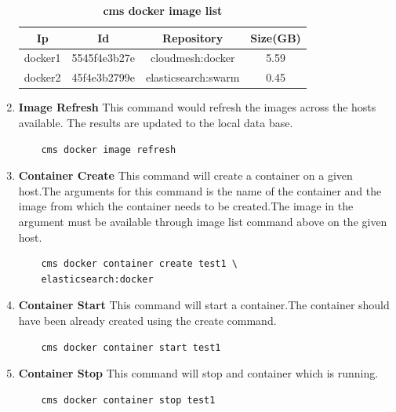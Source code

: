 \documentclass[9pt,twocolumn,twoside]{../../styles/osajnl}
\begin{document}
\begin{enumerate}
    \begin{table}[h!]
     \caption{\bf cms docker image list }
     \begin{tabular}{cccc}
     \hline
      Ip & Id & Repository & Size(GB)\\
      \hline
      docker1 & 5545f4e3b27e & cloudmesh:docker & 5.59 \\
      docker2 & 45f4e3b2799e & elasticsearch:swarm & 0.45 \\
     \hline
     \end{tabular}
     \label{tab:tab2}
     \end{table}
     
    \item \textbf{Image Refresh} 
     This command would refresh the images across the hosts available. The results are updated to the local data base.
    \begin{verbatim}
    cms docker image refresh
    \end{verbatim}

    \item \textbf{Container Create}
     This command will create a container on a given host.The arguments for this command is the name of the container and the image from which the container needs to be created.The image in the argument must be available through image list command above on the given host.\\
 
    \begin{verbatim}
    cms docker container create test1 \
    elasticsearch:docker
    \end{verbatim}
    
    \item \textbf{Container Start}
     This command will start a container.The container should have been already created using the create command.\\

    \begin{verbatim}
    cms docker container start test1
    \end{verbatim}     
     
    \item \textbf{Container Stop}
     This command will stop and container which is running.\\

    \begin{verbatim}
    cms docker container stop test1
    \end{verbatim}  
    

\end{enumerate}
\end{document}
